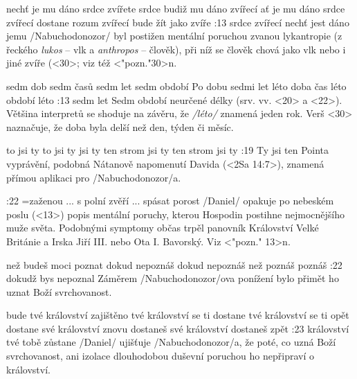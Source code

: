     {nechť je mu dáno srdce zvířete}   %
    {srdce budiž mu dáno zvířecí}   %
    {ať je mu dáno srdce zvířecí}   %
    {dostane rozum zvířecí}   %
    {bude žít jako zvíře}   %
:13 {srdce zvířecí nechť jest dáno jemu} 
     \x/Nabuchodonozor/  byl postižen mentální poruchou zvanou lykantropie 
     (z řeckého {\em lukos} -- vlk a {\em anthropos} -- člověk), 
     při níž  se člověk chová jako vlk nebo i jiné zvíře (<30>; viz též <"pozn."30>n. 

    {sedm dob}   %
    {sedm časů}   %
    {sedm let}   %
    {sedm období}   %
    {Po dobu sedmi let}   %
\ww   %
    {léto}   %
    {doba}   %
    {čas}   %
    {léto}   %
    {období}   %
    {léto}   %
:13 {sedm let} 
     Sedm období neurčené délky (srv. vv. <20> a <22>). Většina interpretů se shoduje na závěru, že {\em \x/léto/} znamená jeden rok. Verš <30> naznačuje, že doba byla delší než den, týden či měsíc.

    {to jsi ty}   %
    {to jsi ty}   %
    {jsi ty}   %
    {ten strom jsi ty}   %
    {ten strom jsi ty}   %
:19 {Ty jsi ten} Pointa vyprávění, podobná Nátanově napomenutí Davida (<2Sa 14:7>), znamená přímou aplikaci pro \x/Nabuchodonozor/a.

:22 {}={zaženou ... s polní zvěří ... spásat porost}  \x/Daniel/ opakuje po nebeském poslu (<13>) popis mentální poruchy, kterou Hospodin postihne nejmocnějšího muže světa. Podobnými symptomy občas trpěl panovník Království Velké Británie a Irska Jiří III. nebo Ota I. Bavorský. Viz <"pozn." 13>n.

    {než budeš moci poznat}   %
    {dokud nepoznáš}   %
    {dokud nepoznáš} %
    {než poznáš}   %
    {poznáš}   %
:22 {dokudž bys nepoznal} Záměrem \x/Nabuchodonozor/ova ponížení bylo přimět ho uznat Boží svrchovanost. 

    {bude tvé království zajištěno}   %
    {tvé království se ti dostane}   %
    {tvé království se ti opět dostane}   %
    {své království znovu dostaneš}   %
    {své království dostaneš zpět}   %
:23 {království tvé tobě zůstane} \x/Daniel/ ujišťuje \x/Nabuchodonozor/a, že poté, co uzná Boží svrchovanost, ani izolace dlouhodobou duševní poruchou ho nepřipraví o království.

